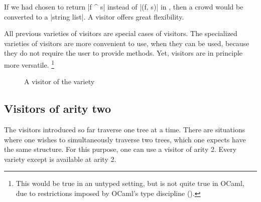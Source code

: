 \documentclass[11pt,a4paper,twoside]{article}
\begin{document}
If we had chosen to return \oc|f ^ s| instead of \oc|(f, s)| in
, then a crowd would be converted to
a \oc|string list|. A \fold visitor offers great flexibility.

All previous varieties of visitors are special cases of \fold visitors. The
specialized varieties of visitors are more convenient to use, when they can be
used, because they do not require the user to provide \tyconascendingmethod{}
methods. Yet, \fold visitors are in principle more versatile.%
%
\footnote{This would be true in an untyped setting, but is not quite true in OCaml,
due to restrictions imposed by OCaml's type discipline ().}



\begin{figure}[p]
\vspace{-\baselineskip}
\caption{A visitor of the \itertwo variety}
\label{fig:expr02}
\end{figure}

\begin{comment}
\begin{figure}[p]
\orig{expr03}
\vspace{-\baselineskip}
\processed{expr03}
\caption{A visitor of the \maptwo variety}
\label{fig:expr03}
\end{figure}
\end{comment}

\subsection{Visitors of arity two}
\label{sec:intro:aritytwo}

The visitors introduced so far traverse one tree at a time. There are
situations where one wishes to simultaneously traverse two trees, which one
expects have the same structure. For this purpose, one can use a visitor of
arity 2. Every variety except \mapendo is available at arity 2.
\end{document}
